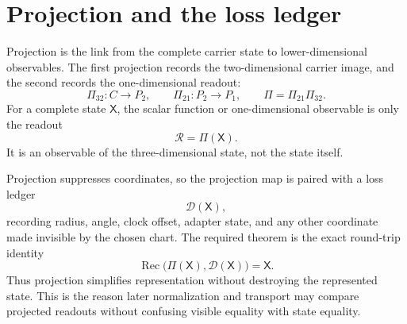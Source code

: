 \documentclass[11pt]{article}
\theoremstyle{definition}
\begin{document}

\section{Projection and the loss ledger}\label{sec:ledgered-projection}

Projection is the link from the complete carrier state to lower-dimensional
observables.  The first projection records the two-dimensional carrier image,
and the second records the one-dimensional readout:
\[
\Pi_{32}:C\to P_2,
\qquad
\Pi_{21}:P_2\to P_1,
\qquad
\Pi=\Pi_{21}\Pi_{32}.
\]
For a complete state \(\mathsf X\), the scalar function or one-dimensional
observable is only the readout
\[
\mathcal R=\Pi(\mathsf X).
\]
It is an observable of the three-dimensional state, not the state itself.

Projection suppresses coordinates, so the projection map is paired with a
loss ledger
\[
\mathcal D(\mathsf X),
\]
recording radius, angle, clock offset, adapter state, and any other coordinate
made invisible by the chosen chart.  The required theorem is the exact
round-trip identity
\[
\operatorname{Rec}\bigl(\Pi(\mathsf X),\mathcal D(\mathsf X)\bigr)
=\mathsf X.
\]
Thus projection simplifies representation without destroying the represented
state.  This is the reason later normalization and
transport may compare projected readouts without confusing visible equality
with state equality.
\end{document}
